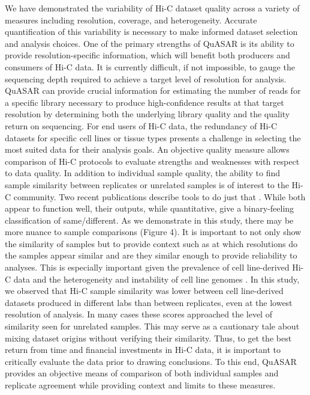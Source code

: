 We have demonstrated the variability of Hi-C dataset quality across a variety of measures including resolution, coverage, and heterogeneity. Accurate quantification of this variability is necessary to make informed dataset selection and analysis choices. One of the primary strengths of QuASAR is its ability to provide resolution-specific information, which will benefit both producers and consumers of Hi-C data. It is currently difficult, if not impossible, to gauge the sequencing depth required to achieve a target level of resolution for analysis. QuASAR can provide crucial information for estimating the number of reads for a specific library necessary to produce high-confidence results at that target resolution by determining both the underlying library quality and the quality return on sequencing. For end users of Hi-C data, the redundancy of Hi-C datasets for specific cell lines or tissue types presents a challenge in selecting the most suited data for their analysis goals. An objective quality measure allows comparison of Hi-C protocols to evaluate strengths and weaknesses with respect to data quality. In addition to individual sample quality, the ability to find sample similarity between replicates or unrelated samples is of interest to the Hi-C community. Two recent publications describe tools to do just that \cite{yang_hicrep:_2017,yan_hic-spector:_2017}. While both appear to function well, their outputs, while quantitative, give a binary-feeling classification of same/different. As we demonstrate in this study, there may be more nuance to sample comparisons (Figure 4). It is important to not only show the similarity of samples but to provide context such as at which resolutions do the samples appear similar and are they similar enough to provide reliability to analyses. This is especially important given the prevalence of cell line-derived Hi-C data and the heterogeneity and instability of cell line genomes \cite{khan_heterogeneous_2017,jemaa_heterogeneity_2017}. In this study, we observed that Hi-C sample similarity was lower between cell line-derived datasets produced in different labs than between replicates, even at the lowest resolution of analysis. In many cases these scores approached the level of similarity seen for unrelated samples. This may serve as a cautionary tale about mixing dataset origins without verifying their similarity. Thus, to get the best return from time and financial investments in Hi-C data, it is important to critically evaluate the data prior to drawing conclusions. To this end, QuASAR provides an objective means of comparison of both individual samples and replicate agreement while providing context and limits to these measures.

